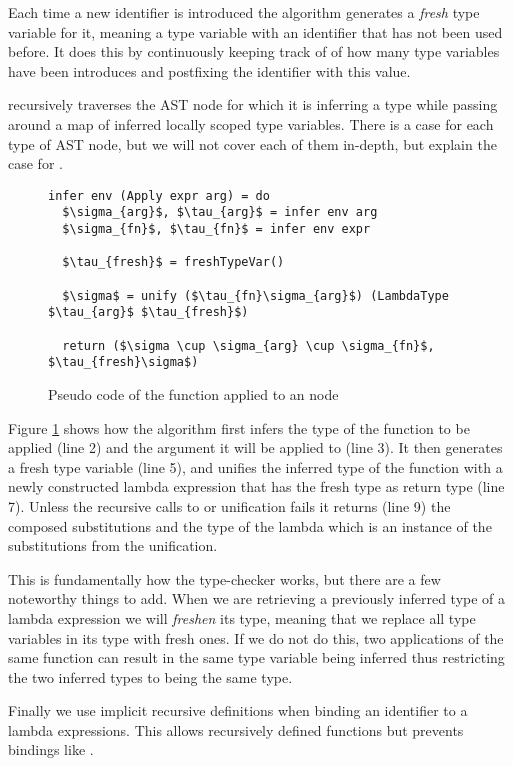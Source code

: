 Each time a new identifier is introduced the algorithm generates a \emph{fresh} type variable for it, meaning a type variable with an identifier that has not been used before. It does this by continuously keeping track of of how many type variables have been introduces and postfixing the identifier with this value.

 recursively traverses the AST node for which it is inferring a type while passing around a map of inferred locally scoped type variables. There is a case for each type of AST node, but we will not cover each of them in-depth, but explain the case for .
\begin{figure}
\begin{lstlisting}[mathescape=true]
infer env (Apply expr arg) = do
  $\sigma_{arg}$, $\tau_{arg}$ = infer env arg
  $\sigma_{fn}$, $\tau_{fn}$ = infer env expr

  $\tau_{fresh}$ = freshTypeVar()

  $\sigma$ = unify ($\tau_{fn}\sigma_{arg}$) (LambdaType $\tau_{arg}$ $\tau_{fresh}$)

  return ($\sigma \cup \sigma_{arg} \cup \sigma_{fn}$, $\tau_{fresh}\sigma$)
\end{lstlisting}
\caption{Pseudo code of the  function applied to an  node}
\label{fig:infer-apply}
\end{figure}

Figure \ref{fig:infer-apply} shows how the algorithm first infers the type of the function to be applied (line 2) and the argument it will be applied to (line 3). It then generates a fresh type variable (line 5), and unifies the inferred type of the function with a newly constructed lambda expression that has the fresh type as return type (line 7). Unless the recursive calls to  or unification fails it returns (line 9) the composed substitutions and the type of the lambda which is an instance of the substitutions from the unification.

This is fundamentally how the type-checker works, but there are a few noteworthy things to add. When we are retrieving a previously inferred type of a lambda expression we will \emph{freshen} its type, meaning that we replace all type variables in its type with fresh ones. If we do not do this, two applications of the same function can result in the same type variable being inferred thus restricting the two inferred types to being the same type.

Finally we use implicit recursive definitions when binding an identifier to a lambda expressions. This allows recursively defined functions but prevents bindings like .


